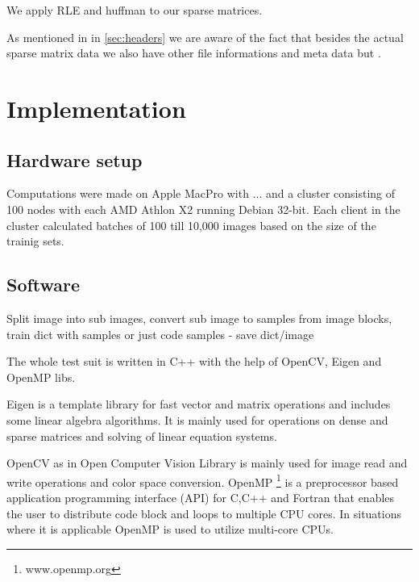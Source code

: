 We apply RLE and huffman to our sparse matrices. 


As mentioned in in \ref{sec:headers} we are aware of the fact that besides
the actual sparse matrix data we also have other file informations and meta
data but .  



\section{Implementation}
%

\subsection*{Hardware setup}
Computations were made on Apple MacPro with ... 
and a cluster consisting of 100 nodes with each AMD Athlon X2  running Debian 32-bit. Each client in the cluster calculated batches of
100 till 10,000 images based on the size of the trainig sets.

\subsection*{Software}

Split image into sub images, convert sub image to samples from image blocks, 
train dict with samples or just code samples - save dict/image

The whole test suit is written in C++ with the help  of OpenCV, Eigen and OpenMP libs.

Eigen\cite{Eigen} is a template library for fast vector and matrix operations 
and includes some linear algebra algorithms. It is mainly used for operations on
dense and sparse matrices and solving of linear equation systems.

OpenCV\cite{OpenCV} as in Open Computer Vision Library is mainly used for
image read and write operations and color space conversion. OpenMP
\footnote{www.openmp.org\cite{OpenMP}} is a preprocessor based application
programming interface (API) for C,C++ and Fortran that enables the user to
distribute code block and loops to multiple CPU cores. In situations where it is
applicable OpenMP is used to utilize multi-core CPUs. 

